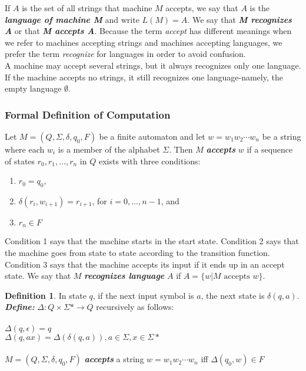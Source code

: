 \documentclass{article}
\theoremstyle{definition}
\newtheorem{definition}{Definition}[section]
\newcommand{\define}[1]{\textbf{\textit{#1}}}
\begin{document}
If $A$ is the set of all strings that machine $M$ accepts, we say that $A$ is the \define{language of machine M} and write $L(M) = A$. We say that \define{M recognizes A} or that \define{M accepts A}. Because the term \emph{accept} has different meanings when we refer to machines accepting strings and machines accepting languages, we prefer the term \emph{recognize} for languages in order to avoid confusion. \\ 

A machine may accept several strings, but it always recognizes only one language. If the machine accepts no strings, it still recognizes one language-namely, the empty language  $\emptyset$. 

\subsubsection{Formal Definition of Computation}

Let $M = (Q, \Sigma, \delta, q_{0}, F)$ be a finite automaton and let $w=w_{1}w_{2} \cdots w_{n}$ be a string where each $w_{i}$ is a member of the alphabet $\Sigma$. Then $M$ \define{accepts} $w$ if a sequence of states $r_{0}, r_{1}, \dots, r_{n}$ in $Q$ exists with three conditions:

\begin{enumerate}
  \item $r_0 = q_0$,
  \item $\delta(r_{i},w_{i+1}) = r_{i+1}$, for $i=0, \dots, n-1$, and 
  \item $r_{n} \in F$
\end{enumerate}

Condition 1 says that the machine starts in the start state. Condition 2 says that the machine goes from state to state according to the transition function. Condition 3 says that the machine accepts its input if it ends up in an accept state. We say that $M$ \define{recognizes language} $A$ if $A = \{w \vert M \textrm{ accepts } w \}$. 

\begin{definition}
  In state $q$, if the next input symbol is $a$, the next state is $\delta(q,a)$. \\ 
  \define{Define:} $\Delta: Q \times \Sigma * \rightarrow Q$ recursively as follows: \\  \\ 
    $\Delta(q,\epsilon) = q$ \\ 
    $\Delta(q,ax) = \Delta(\delta(q,a)), a \in \Sigma, x \in \Sigma *$ \\ \\
  $M = (Q,\Sigma,\delta, q_0, F)$ \define{accepts} a string $w = w_{1}w_{2} \cdots w_{n}$ iff $\Delta(q_{0},w) \in F$
\end{definition}
\end{document}
